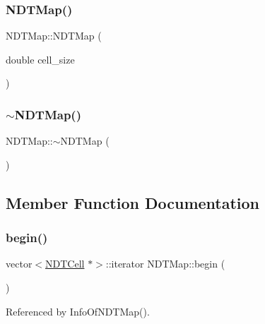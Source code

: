 \subsubsection{\texorpdfstring{N\+D\+T\+Map()}{NDTMap()}}
{\footnotesize\ttfamily N\+D\+T\+Map\+::\+N\+D\+T\+Map (\begin{DoxyParamCaption}\item[{double}]{cell\+\_\+size }\end{DoxyParamCaption})\hspace{0.3cm}{\ttfamily [explicit]}}

\mbox{\label{classNDTMap_af6e42f0f13a33e6027e14635631e1312}} 
\subsubsection{\texorpdfstring{$\sim$\+N\+D\+T\+Map()}{~NDTMap()}}
{\footnotesize\ttfamily N\+D\+T\+Map\+::$\sim$\+N\+D\+T\+Map (\begin{DoxyParamCaption}{ }\end{DoxyParamCaption})}



\subsection{Member Function Documentation}
\mbox{\label{classNDTMap_adf9226d12395621fad8f75d94e9f8cc7}} 
\subsubsection{\texorpdfstring{begin()}{begin()}\hspace{0.1cm}{\footnotesize\ttfamily [1/2]}}
{\footnotesize\ttfamily vector$<$\hyperlink{classNDTCell}{N\+D\+T\+Cell} $\ast$$>$\+::iterator N\+D\+T\+Map\+::begin (\begin{DoxyParamCaption}{ }\end{DoxyParamCaption})\hspace{0.3cm}{\ttfamily [inline]}}



Referenced by Info\+Of\+N\+D\+T\+Map().

\mbox{\label{classNDTMap_a696381901e5f856af6c4ecec37770e1f}} 
